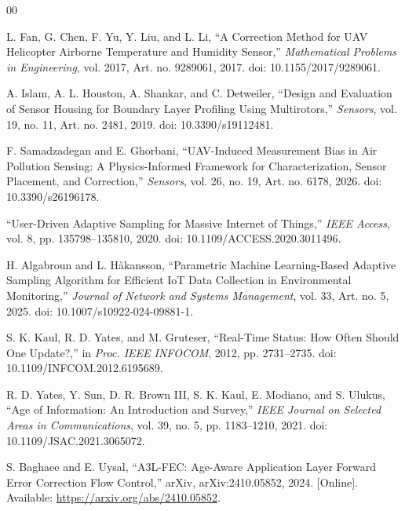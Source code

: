 \documentclass[11pt, a4paper]{article}
\begin{document}
\begin{thebibliography}{00}

 L. Fan, G. Chen, F. Yu, Y. Liu, and L. Li, ``A Correction Method for UAV Helicopter Airborne Temperature and Humidity Sensor,'' \textit{Mathematical Problems in Engineering}, vol. 2017, Art. no. 9289061, 2017. doi: 10.1155/2017/9289061.

 A. Islam, A. L. Houston, A. Shankar, and C. Detweiler, ``Design and Evaluation of Sensor Housing for Boundary Layer Profiling Using Multirotors,'' \textit{Sensors}, vol. 19, no. 11, Art. no. 2481, 2019. doi: 10.3390/s19112481.

 F. Samadzadegan and E. Ghorbani, ``UAV-Induced Measurement Bias in Air Pollution Sensing: A Physics-Informed Framework for Characterization, Sensor Placement, and Correction,'' \textit{Sensors}, vol. 26, no. 19, Art. no. 6178, 2026. doi: 10.3390/s26196178.

 ``User-Driven Adaptive Sampling for Massive Internet of Things,'' \textit{IEEE Access}, vol. 8, pp. 135798--135810, 2020. doi: 10.1109/ACCESS.2020.3011496.

 H. Algabroun and L. Håkansson, ``Parametric Machine Learning-Based Adaptive Sampling Algorithm for Efficient IoT Data Collection in Environmental Monitoring,'' \textit{Journal of Network and Systems Management}, vol. 33, Art. no. 5, 2025. doi: 10.1007/s10922-024-09881-1.

 S. K. Kaul, R. D. Yates, and M. Gruteser, ``Real-Time Status: How Often Should One Update?,'' in \textit{Proc. IEEE INFOCOM}, 2012, pp. 2731--2735. doi: 10.1109/INFCOM.2012.6195689.

 R. D. Yates, Y. Sun, D. R. Brown III, S. K. Kaul, E. Modiano, and S. Ulukus, ``Age of Information: An Introduction and Survey,'' \textit{IEEE Journal on Selected Areas in Communications}, vol. 39, no. 5, pp. 1183--1210, 2021. doi: 10.1109/JSAC.2021.3065072.

 S. Baghaee and E. Uysal, ``A3L-FEC: Age-Aware Application Layer Forward Error Correction Flow Control,'' arXiv, arXiv:2410.05852, 2024. [Online]. Available: \url{https://arxiv.org/abs/2410.05852}.

\end{thebibliography}
\end{document}
